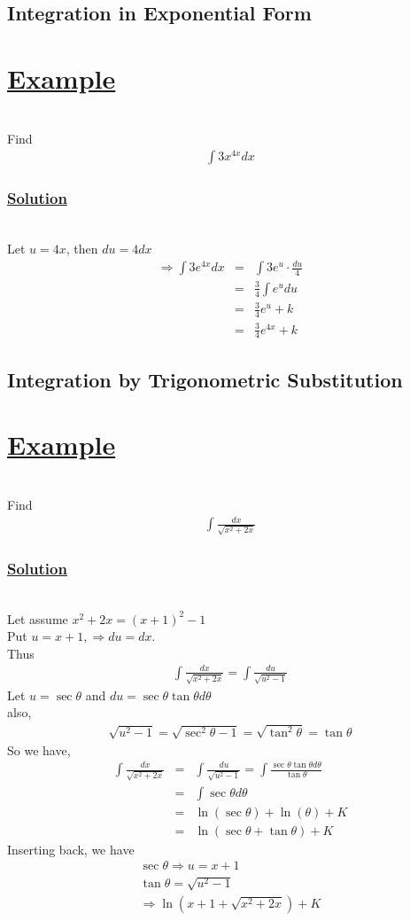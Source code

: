 \documentclass[12pt]{report}
\newcommand{\ubt}[1]{\textbf{\underline{#1}}}
\newcommand{\sps}{\\[0.2cm]}
\newcommand{\spn}[1]{\\[#1cm]}
\newcommand{\solution}{\subsubsection{\ubt{Solution}}{~}\spn{-2}}
\newcommand{\eg}{\section*{\ubt{Example}}{~}\spn{-1}}
\begin{document}
	
	\subsection{Integration in Exponential Form}
	\eg
	Find
	\begin{eqnarray*}
		\int 3x^{4x}dx
	\end{eqnarray*}
	\solution
	Let $u = 4x$, then $du = 4dx$
	\begin{eqnarray*}
		\Rightarrow \int 3e^{4x}dx &=& \int 3e^{u} \cdot \frac{du}{4}\sps
		&=& \frac{3}{4}\int e^u du\sps
		&=& \frac{3}{4}e^u + k\sps
		&=& \frac{3}{4}e^{4x} + k
	\end{eqnarray*}
	
	\subsection{Integration by Trigonometric Substitution}
	\eg
	Find
	\begin{eqnarray*}
		\int\frac{dx}{\sqrt{x^2 + 2x}}
	\end{eqnarray*}
	\solution
	Let assume $x^2 + 2x = (x+1)^2 - 1$\\
	Put $u = x+1, \Rightarrow du = dx$.\\
	Thus
	\begin{eqnarray*}
		\int\frac{dx}{\sqrt{x^2 + 2x}} = \int \frac{du}{\sqrt{u^2 - 1}}
	\end{eqnarray*}	
	Let $u = \sec\theta$ and $du = \sec\theta\tan\theta d \theta$\\
	also,
	\begin{eqnarray*}
		\sqrt{u^2 - 1} = \sqrt{\sec^2\theta - 1} = \sqrt{\tan^2\theta} = \tan\theta
	\end{eqnarray*}
	So we have,
	\begin{eqnarray*}
			\int\frac{dx}{\sqrt{x^2 + 2x}} &=& \int\frac{du}{\sqrt{u^2 - 1}} = \int\frac{\sec\theta\tan\theta d\theta}{\tan \theta}\sps
			&=& \int \sec\theta d\theta\sps
			&=& \ln(\sec\theta) + \ln(\theta) + K\sps
			&=& \ln(\sec\theta + \tan\theta) + K
	\end{eqnarray*}
	Inserting back, we have
	\begin{gather*}
		\sec\theta \Rightarrow u = x + 1\sps
		\tan\theta = \sqrt{u^2 - 1}\sps
		\Rightarrow \ln(x+1 + \sqrt{x^2 + 2x}) + K
	\end{gather*}
	
\end{document}
